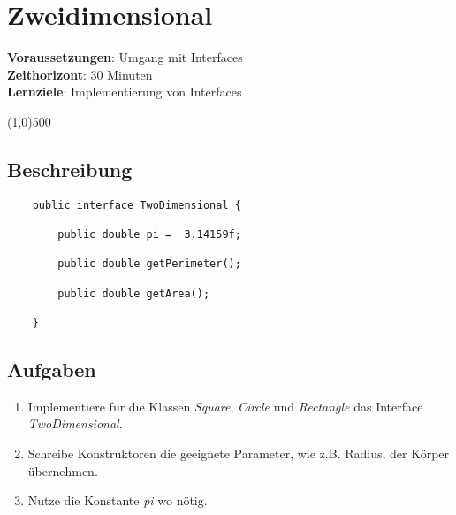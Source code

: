

\chapter*{Zweidimensional}

\headingfont
\parbox {\textwidth}{
    \textbf{Voraussetzungen}: Umgang mit Interfaces \\
    \textbf{Zeithorizont}: 30 Minuten \\
    \textbf{Lernziele}: Implementierung von Interfaces
}

\normalfont
\begin{center}
\line(1,0){500}
\end{center}
\vspace{1cm}

\section*{Beschreibung}
\begin{lstlisting}
	public interface TwoDimensional {
    
        public double pi =  3.14159f;
        
        public double getPerimeter();
        
        public double getArea();
        
	}
\end{lstlisting}

\section*{Aufgaben}
\begin{enumerate}
    \item Implementiere für die Klassen \textit{Square}, \textit{Circle} und \textit{Rectangle} das Interface \textit{TwoDimensional}.
    \item Schreibe Konstruktoren die geeignete Parameter, wie z.B. Radius, der Körper übernehmen.
    \item Nutze die Konstante \textit{pi} wo nötig.
\end{enumerate}
